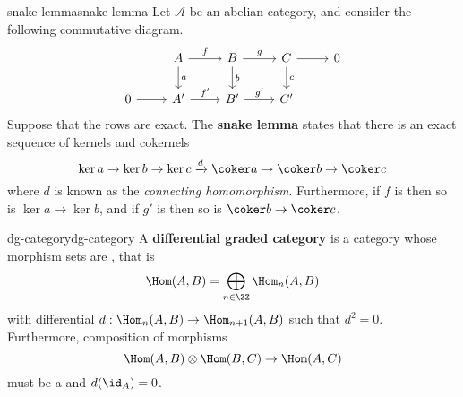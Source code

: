 \begin{topic}{snake-lemma}{snake lemma}
    Let $\mathcal{A}$ be an abelian category, and consider the following commutative diagram.
    \[ \begin{tikzcd} & A \arrow{d}{a} \arrow{r}{f} & B \arrow{d}{b} \arrow{r}{g} & C \arrow{d}{c} \arrow{r} & 0 \\ 0 \arrow{r} & A' \arrow{r}{f'} & B' \arrow{r}{g'} & C' \end{tikzcd} \]
    Suppose that the rows are exact. The \textbf{snake lemma} states that there is an exact sequence of kernels and cokernels
    \[ \ker a \rightarrow \ker b \rightarrow \ker c \xrightarrow{d} \coker a \rightarrow \coker b \rightarrow \coker c \]
    where $d$ is known as the \textit{connecting homomorphism}. Furthermore, if $f$ is  then so is $\ker a \to \ker b$, and if $g'$ is  then so is $\coker b \to \coker c$.
\end{topic}

\begin{topic}{dg-category}{dg-category}
    A \textbf{differential graded category} is a category whose morphism sets are , that is
    \[ \Hom(A, B) = \bigoplus_{n \in \ZZ} \Hom_n(A, B) \]
    with differential $d : \Hom_n(A, B) \to \Hom_{n + 1}(A, B)$ such that $d^2 = 0$. Furthermore, composition of morphisms
    \[ \Hom(A, B) \otimes \Hom(B, C) \to \Hom(A, C) \]
    must be a  and $d(\id_A) = 0$.
\end{topic}

